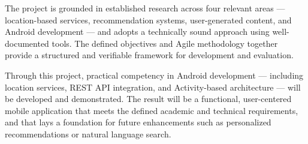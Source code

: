 \documentclass[12pt, a4paper]{article}
\begin{document}
The project is grounded in established research across four relevant areas — location-based services, recommendation systems, user-generated content, and Android development — and adopts a technically sound approach using well-documented tools. The defined objectives and Agile methodology together provide a structured and verifiable framework for development and evaluation.

Through this project, practical competency in Android development — including location services, REST API integration, and Activity-based architecture — will be developed and demonstrated. The result will be a functional, user-centered mobile application that meets the defined academic and technical requirements, and that lays a foundation for future enhancements such as personalized recommendations or natural language search.

\newpage


\end{document}
